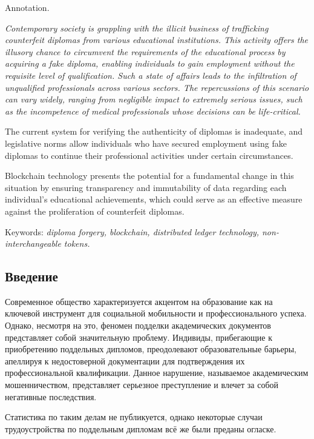 \documentclass{mirea-article}
\begin{document}
Annotation. {\itshape Contemporary society is grappling with the illicit business of trafficking counterfeit diplomas from various educational institutions. This activity offers the illusory chance to circumvent the requirements of the educational process by acquiring a fake diploma, enabling individuals to gain employment without the requisite level of qualification. Such a state of affairs leads to the infiltration of unqualified professionals across various sectors. The repercussions of this scenario can vary widely, ranging from negligible impact to extremely serious issues, such as the incompetence of medical professionals whose decisions can be life-critical.
\par The current system for verifying the authenticity of diplomas is inadequate, and legislative norms allow individuals who have secured employment using fake diplomas to continue their professional activities under certain circumstances.
\par Blockchain technology presents the potential for a fundamental change in this situation by ensuring transparency and immutability of data regarding each individual's educational achievements, which could serve as an effective measure against the proliferation of counterfeit diplomas.}

Keywords: \textit{diploma forgery, blockchain, distributed ledger technology, non-interchangeable tokens.}

\subsection*{Введение}
\label{sec:introduction}

Современное общество характеризуется акцентом на образование как на ключевой инструмент для социальной мобильности и профессионального успеха. Однако, несмотря на это, феномен подделки академических документов представляет собой значительную проблему. Индивиды, прибегающие к приобретению поддельных дипломов, преодолевают образовательные барьеры, апеллируя к недостоверной документации для подтверждения их профессиональной квалификации. Данное нарушение, называемое академическим мошенничеством, представляет серьезное преступление и влечет за собой негативные последствия.

Статистика по таким делам не публикуется, однако некоторые случаи трудоустройства по поддельным дипломам всё же были преданы огласке. ~\cite{bib:korochka-ne-glavnoe, bib:nursing-diploma-scheme}
\end{document}
